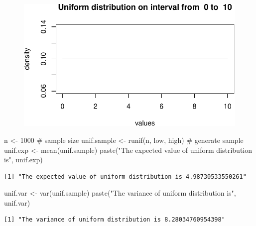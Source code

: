 \documentclass[
  letterpaper,
  DIV=11,
  numbers=noendperiod]{scrreprt}
\newenvironment{Shaded}{\begin{snugshade}}{\end{snugshade}}
\newcommand{\CommentTok}[1]{\textcolor[rgb]{0.37,0.37,0.37}{#1}}
\newcommand{\DecValTok}[1]{\textcolor[rgb]{0.68,0.00,0.00}{#1}}
\newcommand{\FunctionTok}[1]{\textcolor[rgb]{0.28,0.35,0.67}{#1}}
\newcommand{\NormalTok}[1]{\textcolor[rgb]{0.00,0.23,0.31}{#1}}
\newcommand{\OtherTok}[1]{\textcolor[rgb]{0.00,0.23,0.31}{#1}}
\newcommand{\StringTok}[1]{\textcolor[rgb]{0.13,0.47,0.30}{#1}}
\begin{document}
\begin{figure}[H]

{\centering \includegraphics{./04-distributions_files/figure-pdf/unnamed-chunk-9-1.pdf}

}

\end{figure}

\begin{Shaded}
\begin{Highlighting}[]
\NormalTok{n }\OtherTok{\textless{}{-}} \DecValTok{1000} \CommentTok{\# sample size}
\NormalTok{unif.sample }\OtherTok{\textless{}{-}} \FunctionTok{runif}\NormalTok{(n, low, high) }\CommentTok{\# generate sample}
\NormalTok{unif.exp }\OtherTok{\textless{}{-}} \FunctionTok{mean}\NormalTok{(unif.sample)}
\FunctionTok{paste}\NormalTok{(}\StringTok{"The expected value of uniform distribution is"}\NormalTok{, unif.exp)}
\end{Highlighting}
\end{Shaded}

\begin{verbatim}
[1] "The expected value of uniform distribution is 4.98730533550261"
\end{verbatim}

\begin{Shaded}
\begin{Highlighting}[]
\NormalTok{unif.var }\OtherTok{\textless{}{-}} \FunctionTok{var}\NormalTok{(unif.sample)}
\FunctionTok{paste}\NormalTok{(}\StringTok{"The variance of uniform distribution is"}\NormalTok{, unif.var)}
\end{Highlighting}
\end{Shaded}

\begin{verbatim}
[1] "The variance of uniform distribution is 8.28034760954398"
\end{verbatim}
\end{document}
